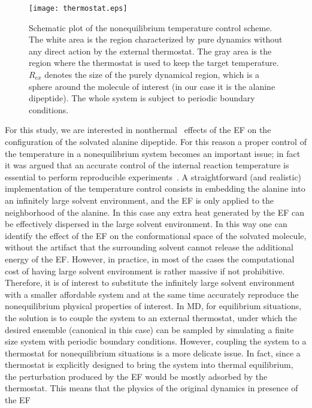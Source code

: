 \documentclass[a4paper,preprint,unsortedaddress,onecolumn]{revtex4-1}
\begin{document}
\begin{figure}
  \centering
  \texttt{[image: thermostat.eps]}
  \caption{Schematic plot of the nonequilibrium temperature control scheme.
    The white area is the region characterized by pure dynamics without any direct action by the external thermostat.
    The gray area is the region where the thermostat is used to keep the target temperature.
    $R_{ex}$ denotes the size of the purely dynamical region, which
    is a sphere around the molecule of interest (in our case it is the alanine
    dipeptide).
    The whole system is subject to periodic boundary conditions. }
  \label{fig:tmp2}
\end{figure}
For this study, we are interested in 
nonthermal~\cite{delaHoz2005microwaves} effects of the EF
on the configuration of the solvated alanine dipeptide.
For this reason a proper control of the temperature in a nonequilibrium system
becomes an important issue; in fact it was argued that  an
accurate control of the internal reaction temperature is essential to
perform reproducible experiments~\cite{damm2012can}.
A straightforward (and realistic) implementation of the temperature control consists in 
embedding the alanine into an infinitely large solvent environment, and 
the EF is only applied to the neighborhood of the alanine. In this case
any extra heat generated by the EF can be effectively
dispersed in the large solvent environment.
In this way one can identify the effect of the EF on the conformational space of the solvated molecule,
without the artifact that the surrounding solvent cannot release the additional energy of the EF.
However, in practice, in most of the cases the computational cost of having large solvent environment is rather massive if not prohibitive.
Therefore, it is of interest to substitute the infinitely large
solvent environment with a smaller affordable system and at the same time accurately reproduce the nonequilibrium
physical properties of interest.
In MD, for equilibrium situations, the solution is to couple
the system to an external thermostat, under which the desired ensemble
(canonical in this case) can be
sampled by simulating a finite size system with periodic boundary
conditions.
However, coupling the system to a thermostat for nonequilibrium situations is a more delicate issue.
In fact, since a thermostat is explicitly designed to bring the system into
thermal equilibrium,
the perturbation produced by the EF would be mostly adsorbed by the thermostat. This means that the physics of the original dynamics in presence of the EF
\end{document}
